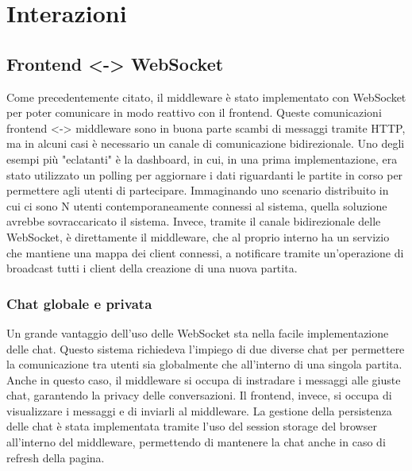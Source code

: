 \chapter{Interazioni}
\label{ch:interazioni} %

\section{Frontend <-> WebSocket} 

Come precedentemente citato, il middleware è stato implementato con WebSocket per poter comunicare in modo reattivo con il frontend. Queste comunicazioni frontend <-> middleware sono in buona parte scambi di messaggi tramite HTTP, ma in alcuni casi è necessario un canale di comunicazione bidirezionale. Uno degli esempi più "eclatanti" è la dashboard, in cui, in una prima implementazione, era stato utilizzato un polling per aggiornare i dati riguardanti le partite in corso per permettere agli utenti di partecipare. Immaginando uno scenario distribuito in cui ci sono N utenti contemporaneamente connessi al sistema, quella soluzione avrebbe sovraccaricato il sistema. Invece, tramite il canale bidirezionale delle WebSocket, è direttamente il middleware, che al proprio interno ha un servizio che mantiene una mappa dei client connessi, a notificare tramite un'operazione di broadcast tutti i client della creazione di una nuova partita.

\subsection{Chat globale e privata}

Un grande vantaggio dell'uso delle WebSocket sta nella facile implementazione delle chat. Questo sistema richiedeva l'impiego di due diverse chat per permettere la comunicazione tra utenti sia globalmente che all'interno di una singola partita. 
Anche in questo caso, il middleware si occupa di instradare i messaggi alle giuste chat, garantendo la privacy delle conversazioni. Il frontend, invece, si occupa di visualizzare i messaggi e di inviarli al middleware. La gestione della persistenza delle chat è stata implementata tramite l'uso del session storage del browser all'interno del middleware, permettendo di mantenere la chat anche in caso di refresh della pagina.

